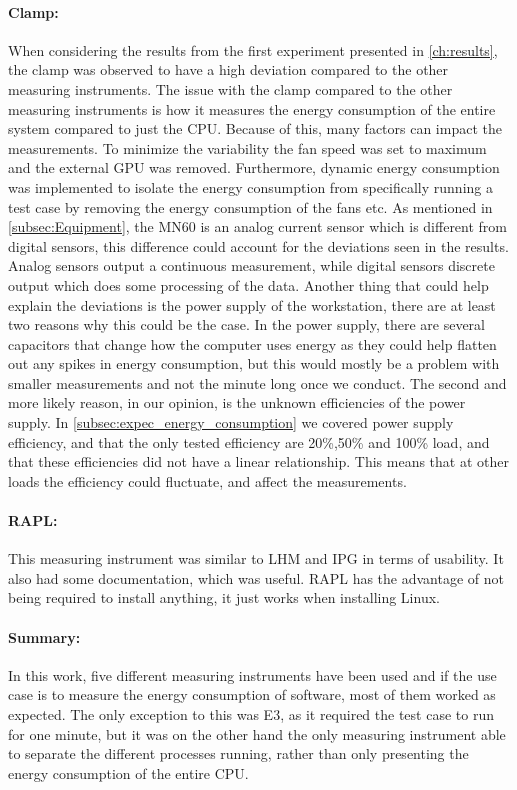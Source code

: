 \paragraph*{Clamp:} When considering the results from the first experiment presented in \cref{ch:results}, the clamp was observed to have a high deviation compared to the other measuring instruments. The issue with the clamp compared to the other measuring instruments is how it measures the energy consumption of the entire system compared to just the CPU. Because of this, many factors can impact the measurements. To minimize the variability the fan speed was set to maximum and the external GPU was removed. Furthermore, dynamic energy consumption was implemented to isolate the energy consumption from specifically running a test case by removing the energy consumption of the fans etc. As mentioned in \cref{subsec:Equipment}, the MN60 is an analog current sensor which is different from digital sensors, this difference could account for the deviations seen in the results. Analog sensors output a continuous measurement, while digital sensors discrete output which does some processing of the data.\cite{DigimonsVSAnamons} Another thing that could help explain the deviations is the power supply of the workstation, there are at least two reasons why this could be the case. In the power supply, there are several capacitors that change how the computer uses energy as they could help flatten out any spikes in energy consumption, but this would mostly be a problem with smaller measurements and not the minute long once we conduct\cite{hackenberg2013}. The second and more likely reason, in our opinion, is the unknown efficiencies of the power supply. In \cref{subsec:expec_energy_consumption} we covered power supply efficiency, and that the only tested efficiency are 20\%,50\% and 100\% load, and that these efficiencies did not have a linear relationship. This means that at other loads the efficiency could fluctuate, and affect the measurements. 


\paragraph*{RAPL:} This measuring instrument was similar to LHM and IPG in terms of usability. It also had some documentation, which was useful. RAPL has the advantage of not being required to install anything, it just works when installing Linux.

\paragraph*{Summary:} In this work, five different measuring instruments have been used and if the use case is to measure the energy consumption of software, most of them worked as expected. The only exception to this was E3, as it required the test case to run for one minute, but it was on the other hand the only measuring instrument able to separate the different processes running, rather than only presenting the energy consumption of the entire CPU. 